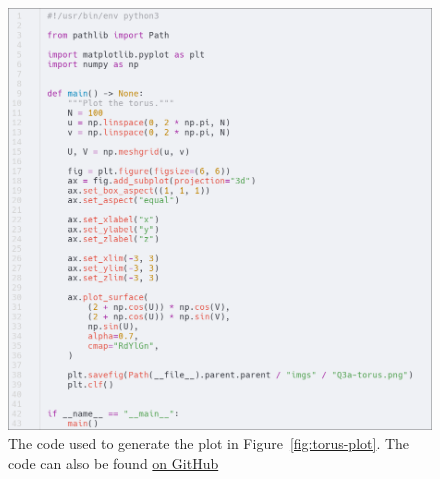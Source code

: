 \documentclass[a4paper]{article}
\begin{document}
\begin{figure}[h]
	\centering
	\includegraphics[scale=0.35]{Q3a-code}
	\caption{The code used to generate the plot in Figure~\ref{fig:torus-plot}. The code can also be found \href{https://github.com/DoctorDalek1963/uni}{on GitHub}}
\end{figure}

\subsection{~}


\end{document}
